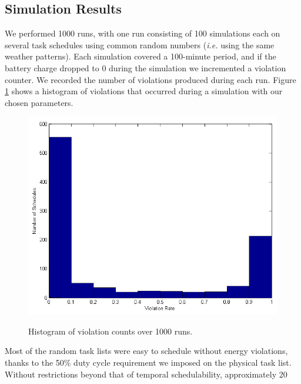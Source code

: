 \subsection{Simulation Results}
We performed 1000 runs, with one run consisting of 100 simulations each on several task schedules using common random numbers (\emph{i.e.} using the same weather patterns).  Each simulation covered a 100-minute period, and if the battery charge dropped to 0 during the simulation we incremented a violation counter.  We recorded the number of violations produced during each run.  Figure \ref{fig:violationhist} shows a histogram of violations that occurred during a simulation with our chosen parameters.
\begin{figure}[htb]
\includegraphics[scale=0.5]{violationhistogram.png}
\label{fig:violationhist}
\caption{Histogram of violation counts over 1000 runs.}
\end{figure}
Most of the random task lists were easy to schedule without energy violations, thanks to the 50\% duty cycle requirement we imposed on the physical task list.  Without restrictions beyond that of temporal schedulability, approximately 20%

